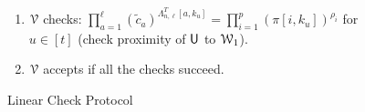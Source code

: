 \begin{figure}[h!]
{\begin{framed}
\begin{enumerate}[{\rm 1.}]
\begin{enumerate}
					\item $\innerproduct(\mathsf{pp},1^m||0^{m-1},\mathsf{cm},r^Tb;z)$ where $z=\beta P_0+\overline{P}\varphi$ and $\mathsf{cm}=c_0^{\beta}\cdot \prod_{a=1}^{s+\ell-1}c_k^{\varphi_k}$ (check the condition $r^TAw=r^Tb$).
					\item $\innerproduct(\mathsf{pp},\bm{1}_{j_u}^T\Lambda_{h,m},C_u,\innp{\delta}{X_u}; V_u)$ for $u\in [t]$ 
					where $C_u=\prod_{i=1}^p(\pi[i,k_u])^{\delta_i}$ and $V_u=\sum_{i\in[p]} \delta_i\ewit[i,\cdot,k_u]$ (consistency of $X_u$ with $\pi$). 
				\end{enumerate}
				\item $\mathcal{V}$ checks: $\prod_{a=1}^\ell(\tilde{c}_a)^{\Lambda^T_{n,\ell}[a,k_u]}=\prod_{i=1}^p(\pi[i,k_u])^{\rho_i}$ for $u\in [t]$ (check proximity of $\mathsf{U}$ to $\mathcal{W}_1$).
				\item $\mathcal{V}$ accepts if all the checks succeed.
			\end{enumerate}
		\end{framed}
		\vspace{-0.4cm}
		\caption{Linear Check Protocol}
		\label{fig:linearcheck}
	}
\end{figure}


